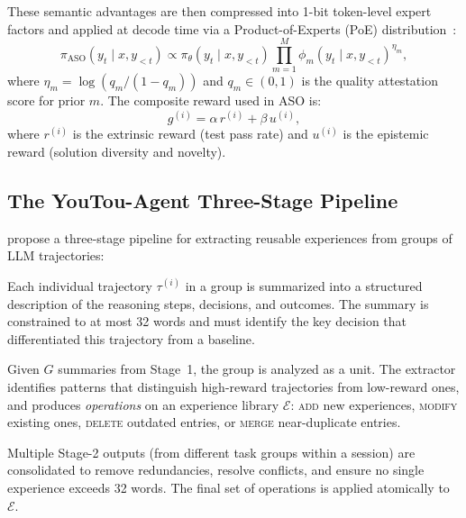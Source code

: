 These semantic advantages are then compressed into 1-bit token-level expert
factors and applied at decode time via a Product-of-Experts (PoE)
distribution~\cite{hinton2002training}:
\begin{equation}
    \pi_{\text{ASO}}(y_t \mid x, y_{<t}) \propto \pi_\theta(y_t \mid x, y_{<t})
    \prod_{m=1}^{M} \phi_m(y_t \mid x, y_{<t})^{\eta_m},
    \label{eq:poe}
\end{equation}
where $\eta_m = \log(q_m / (1 - q_m))$ and $q_m \in (0,1)$ is the quality
attestation score for prior $m$. The composite reward used in ASO is:
\begin{equation}
    g^{(i)} = \alpha\, r^{(i)} + \beta\, u^{(i)},
    \label{eq:aso-reward}
\end{equation}
where $r^{(i)}$ is the extrinsic reward (test pass rate) and $u^{(i)}$ is the
epistemic reward (solution diversity and novelty).

\subsection{The YouTou-Agent Three-Stage Pipeline}

\cite{tencent2025youtoagent} propose a three-stage pipeline for extracting
reusable experiences from groups of LLM trajectories:

\begin{description}[leftmargin=1.5em, font=\normalfont\bfseries]
    \item[Stage 1 -- Trajectory Summarization.]
    Each individual trajectory $\tau^{(i)}$ in a group is summarized into a
    structured description of the reasoning steps, decisions, and outcomes. The
    summary is constrained to at most 32 words and must identify the key
    decision that differentiated this trajectory from a baseline.

    \item[Stage 2 -- Group Advantage Extraction.]
    Given $G$ summaries from Stage~1, the group is analyzed as a unit. The
    extractor identifies patterns that distinguish high-reward trajectories from
    low-reward ones, and produces \emph{operations} on an experience library
    $\mathcal{E}$: \textsc{add} new experiences, \textsc{modify} existing ones,
    \textsc{delete} outdated entries, or \textsc{merge} near-duplicate entries.

    \item[Stage 3 -- Batch Consolidation.]
    Multiple Stage-2 outputs (from different task groups within a session) are
    consolidated to remove redundancies, resolve conflicts, and ensure no single
    experience exceeds 32 words. The final set of operations is applied atomically
    to $\mathcal{E}$.
\end{description}

